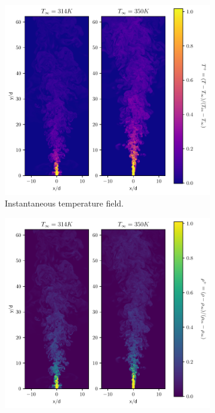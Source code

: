 \begin{figure}[H]
\begin{subfigure}{0.5\textwidth}
	\includegraphics[scale=.45]{figures/Plots/vertical/temp_scaled_vert_noniso.pdf}
	\caption{Instantaneous temperature field.} \label{noniso_temp_1}
\end{subfigure}
\vfill
\begin{subfigure}{0.5\textwidth}
	\centering
	\includegraphics[scale=.45]{figures/Plots/vertical/rho_scaled_vert_noniso.pdf}

\end{subfigure}
\end{figure}
